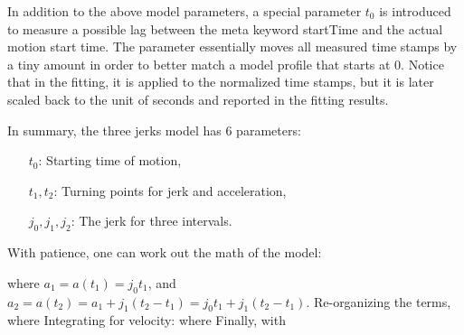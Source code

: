 \documentclass[OPS,lsstdraft,authoryear,toc]{lsstdoc}
\begin{document}
In addition to the above model parameters, a special parameter $t_0$ is introduced to measure a possible lag between the meta keyword startTime and the actual motion start time. The parameter essentially moves all measured time stamps by a tiny amount in order to better match a model profile that starts at 0. Notice that in the fitting, it is applied to the normalized time stamps,
but it is later scaled back to the unit of seconds and reported in the fitting results.

In summary, the three jerks model has 6 parameters:
\begin{itemize}
	\item[$t_0$:] Starting time of motion,
	\item[$t_1, t_2$:] Turning points for jerk and acceleration,
	\item[$j_0, j_1, j_2$:] The jerk for three intervals.
\end{itemize}
With patience, one can work out the math of the model:

where $a_1 = a(t_1) = j_0 t_1$, and $a_2 = a(t_2) = a_1 + j_1 (t_2 - t_1) = j_0 t_1 + j_1 (t_2 - t_1).$ Re-organizing the terms, 
where
Integrating for velocity:
where
Finally, 
with
\end{document}
